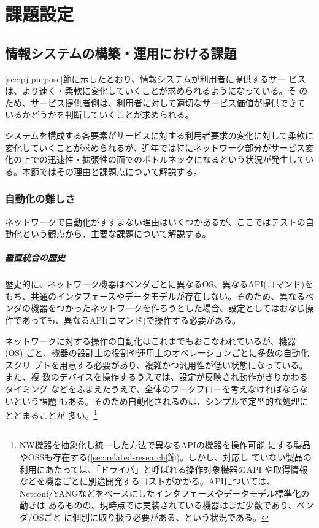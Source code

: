 
\chapter{課題設定}
\label{chap:problem-setting}

 \section{情報システムの構築・運用における課題}
 \label{sec:system-problem}

\ref{sec:pj-purpose}節に示したとおり、情報システムが利用者に提供するサー
ビスは、より速く・柔軟に変化していくことが求められるようになっている。そ
のため、サービス提供者側は、利用者に対して適切なサービス価値が提供できて
いるかどうかを判断していくことが求められる。

システムを構成する各要素がサービスに対する利用者要求の変化に対して柔軟に
変化していくことが求められるが、近年では特にネットワーク部分がサービス変
化の上での迅速性・拡張性の面でのボトルネックになるという状況が発生してい
る。本節ではその理由と課題点について解説する。


  \subsection{自動化の難しさ}
  \label{sec:difficulty}

ネットワークで自動化がすすまない理由はいくつかあるが、ここではテストの自
動化という観点から、主要な課題について解説する。

    \paragraph{垂直統合の歴史}
歴史的に、ネットワーク機器はベンダごとに異なるOS、異なるAPI(コマンド)を
もち、共通のインタフェースやデータモデルが存在しない。そのため、異なるベ
ンダの機器をつかったネットワークを作ろうとした場合、設定としてはおなじ操
作であっても、異なるAPI(コマンド)で操作する必要がある。

ネットワークに対する操作の自動化はこれまでもおこなわれているが、機器(OS)
ごと、機器の設計上の役割や運用上のオペレーションごとに多数の自動化スクリ
プトを用意する必要があり、複雑かつ汎用性が低い状態になっている。また、複
数のデバイスを操作するうえでは、設定が反映され動作がきりかわるタイミング
などをふまえたうえで、全体のワークフローを考えなければならないという課題
もある。そのため自動化されるのは、シンプルで定型的な処理にとどまることが
多い。\footnote{NW機器を抽象化し統一した方法で異なるAPIの機器を操作可能
にする製品やOSSも存在する(\ref{sec:related-research}節)。しかし、対応し
ていない製品の利用にあたっては、「ドライバ」と呼ばれる操作対象機器のAPI
や取得情報などを機器ごとに別途開発するコストがかかる。APIについては、
Netconf/YANGなどをベースにしたインタフェースやデータモデル標準化の動きは
あるものの、現時点では実装されている機器はまだ少数であり、ベンダ/OSごと
に個別に取り扱う必要がある、という状況である。}

